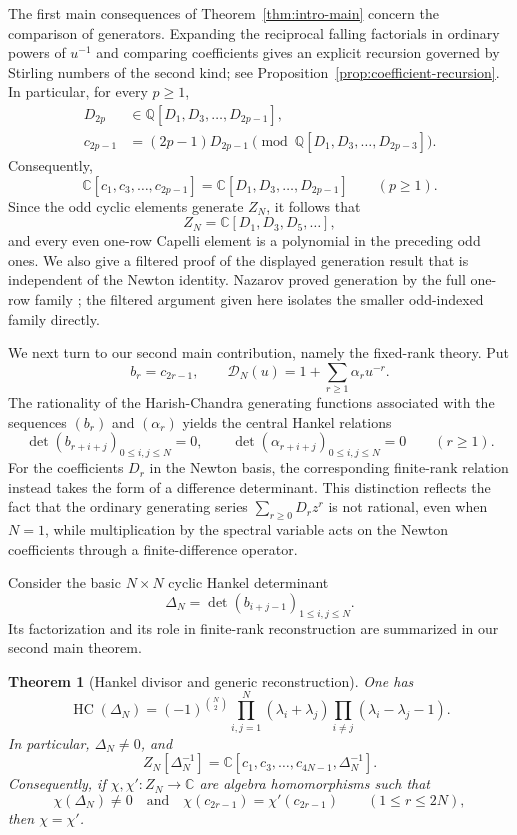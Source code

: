 \documentclass[11pt]{amsart}
\numberwithin{equation}{section}
\newtheorem{theorem}{Theorem}[section]
\theoremstyle{definition}
\theoremstyle{remark}
\newcommand{\C}{\mathbb C}
\newcommand{\Q}{\mathbb Q}
\newcommand{\HC}{\operatorname{HC}}
\newcommand{\calD}{\mathcal D}
\begin{document}
The first main consequences of Theorem~\ref{thm:intro-main} concern
the comparison of generators.  Expanding the reciprocal falling
factorials in ordinary powers of \(u^{-1}\) and comparing coefficients
gives an explicit recursion governed by Stirling numbers of the second
kind; see Proposition~\ref{prop:coefficient-recursion}.  In particular,
for every \(p\geq1\),
\begin{align*}
 D_{2p}
 &\in\Q[D_1,D_3,\ldots,D_{2p-1}],\\
 c_{2p-1}
 &=(2p-1)D_{2p-1}
   \pmod{\Q[D_1,D_3,\ldots,D_{2p-3}]}.
\end{align*}
Consequently,
\[
 \C[c_1,c_3,\ldots,c_{2p-1}]
 =
 \C[D_1,D_3,\ldots,D_{2p-1}]
 \qquad(p\geq1).
\]
Since the odd cyclic elements generate \(Z_N\), it follows that
\[
 Z_N=\C[D_1,D_3,D_5,\ldots],
\]
and every even one-row Capelli element is a polynomial in the preceding
odd ones.  We also give a filtered proof of the displayed generation
result that is independent of the Newton identity.  Nazarov proved
generation by the full one-row family
\cite[Proposition~4.8]{Nazarov1997}; the filtered argument given here
isolates the smaller odd-indexed family directly.

We next turn to our second main contribution, namely the fixed-rank
theory.  Put
\[
 b_r=c_{2r-1},
 \qquad
 \calD_N(u)=1+\sum_{r\geq1}\alpha_ru^{-r}.
\]
The rationality of the Harish-Chandra generating functions associated
with the sequences \((b_r)\) and \((\alpha_r)\) yields the central
Hankel relations
\[
 \det(b_{r+i+j})_{0\leq i,j\leq N}=0,
 \qquad
 \det(\alpha_{r+i+j})_{0\leq i,j\leq N}=0
 \qquad(r\geq1).
\]
For the coefficients \(D_r\) in the Newton basis, the corresponding
finite-rank relation instead takes the form of a difference
determinant.  This distinction reflects the fact that the ordinary
generating series
\(\sum_{r\geq0}D_rz^r\) is not rational, even when \(N=1\), while
multiplication by the spectral variable acts on the Newton
coefficients through a finite-difference operator.

Consider the basic \(N\times N\) cyclic Hankel determinant
\[
 \Delta_N=\det(b_{i+j-1})_{1\leq i,j\leq N}.
\]
Its factorization and its role in finite-rank reconstruction are
summarized in our second main theorem.

\begin{theorem}[Hankel divisor and generic reconstruction]
\label{thm:intro-reconstruction}
One has
\[
 \HC(\Delta_N)
 =
 (-1)^{\binom N2}
 \prod_{i,j=1}^N(\lambda_i+\lambda_j)
 \prod_{i\ne j}(\lambda_i-\lambda_j-1).
\]
In particular, \(\Delta_N\neq0\), and
\[
 Z_N[\Delta_N^{-1}]
 =
 \C[c_1,c_3,\ldots,c_{4N-1},\Delta_N^{-1}].
\]
Consequently, if \(\chi,\chi':Z_N\to\C\) are algebra homomorphisms
such that
\[
 \chi(\Delta_N)\neq0
 \quad\text{and}\quad
 \chi(c_{2r-1})=\chi'(c_{2r-1})
 \qquad(1\leq r\leq2N),
\]
then \(\chi=\chi'\).
\end{theorem}
\end{document}
